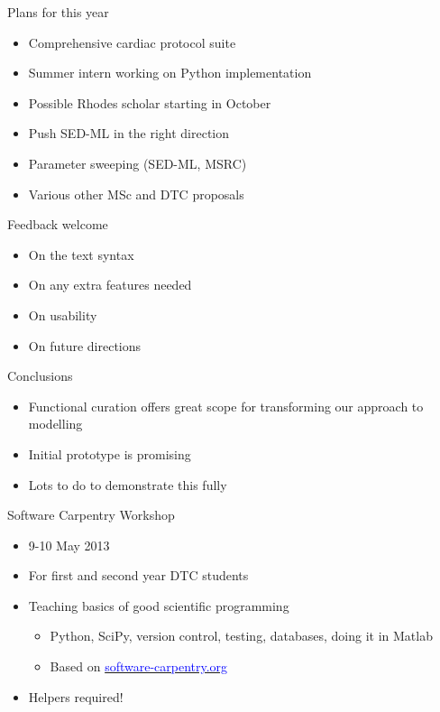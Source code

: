 \documentclass[t,xcolor={usenames,dvipsnames}]{beamer}
\newcommand{\myhref}[2]{\href{#1}{\textcolor{Blue}{#2}}}
\begin{document}
\begin{frame}{Plans for this year}
\begin{itemize}
\item Comprehensive cardiac protocol suite
\item Summer intern working on Python implementation
\item Possible Rhodes scholar starting in October
\item Push SED-ML in the right direction
\item Parameter sweeping (SED-ML, MSRC)
\item Various other MSc and DTC proposals
\end{itemize}
\end{frame}


\begin{frame}{Feedback welcome}
\begin{itemize}
\item On the text syntax
\item On any extra features needed
\item On usability
\item On future directions
\end{itemize}
\end{frame}


\begin{frame}{Conclusions}
\begin{itemize}
\item Functional curation offers great scope for transforming our approach to modelling
\item Initial prototype is promising
\item Lots to do to demonstrate this fully
\end{itemize}
\end{frame}


\begin{frame}{Software Carpentry Workshop}
\begin{itemize}
\item 9-10 May 2013
\item For first and second year DTC students
\item Teaching basics of good scientific programming
  \begin{itemize}
  \item Python, SciPy, version control, testing, databases, doing it in Matlab
  \item Based on \myhref{http://software-carpentry.org/}{software-carpentry.org}
  \end{itemize}
\item Helpers required!
\end{itemize}
\end{frame}
\end{document}
